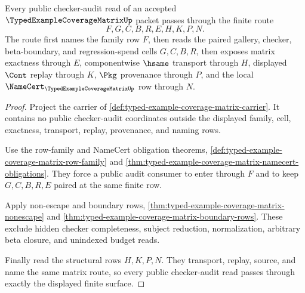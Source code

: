 \begin{theorem}
\label{thm:typed-example-coverage-matrix-public-audit-route}
Every public checker-audit read of an accepted $\TypedExampleCoverageMatrixUp$ packet passes through the finite route
$$
F,G,C,B,R,E,H,K,P,N .
$$
The route first names the family row $F$, then reads the paired gallery, checker, beta-boundary, and regression-spend cells $G,C,B,R$, then exposes matrix exactness through $E$, componentwise $\hsame$ transport through $H$, displayed $\Cont$ replay through $K$, $\Pkg$ provenance through $P$, and the local $\NameCert_{\TypedExampleCoverageMatrixUp}$ row through $N$.
\end{theorem}
\begin{proof}
Project the carrier of \autoref{def:typed-example-coverage-matrix-carrier}. It contains no public checker-audit coordinates outside the displayed family, cell, exactness, transport, replay, provenance, and naming rows.

Use the row-family and NameCert obligation theorems, \autoref{def:typed-example-coverage-matrix-row-family} and \autoref{thm:typed-example-coverage-matrix-namecert-obligations}. They force a public audit consumer to enter through $F$ and to keep $G,C,B,R,E$ paired at the same finite row.

Apply non-escape and boundary rows, \autoref{thm:typed-example-coverage-matrix-nonescape} and \autoref{thm:typed-example-coverage-matrix-boundary-rows}. These exclude hidden checker completeness, subject reduction, normalization, arbitrary beta closure, and unindexed budget reads.

Finally read the structural rows $H,K,P,N$. They transport, replay, source, and name the same matrix route, so every public checker-audit read passes through exactly the displayed finite surface.
\end{proof}

